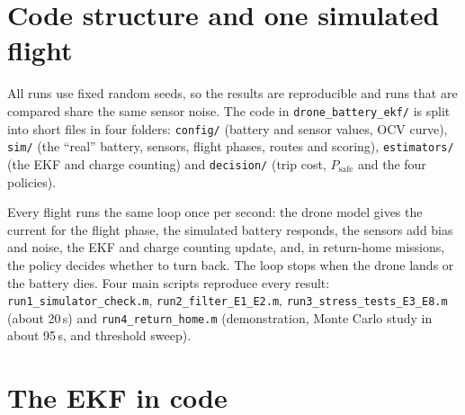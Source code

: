 
\section{Code structure and one simulated flight}\label{sec:i_structure}\label{sec:i_run_flight}\label{sec:i_loop}\label{sec:i_day4}

All runs use fixed random seeds, so the results are reproducible and runs that are compared share the same sensor noise. The code in \texttt{drone\_battery\_ekf/} is split into short files in four folders: \texttt{config/} (battery and sensor values, OCV curve), \texttt{sim/} (the ``real'' battery, sensors, flight phases, routes and scoring), \texttt{estimators/} (the EKF and charge counting) and \texttt{decision/} (trip cost, $P_{\text{safe}}$ and the four policies).

Every flight runs the same loop once per second: the drone model gives the current for the flight phase, the simulated battery responds, the sensors add bias and noise, the EKF and charge counting update, and, in return-home missions, the policy decides whether to turn back. The loop stops when the drone lands or the battery dies. Four main scripts reproduce every result: \texttt{run1\_simulator\_check.m}, \texttt{run2\_filter\_E1\_E2.m}, \texttt{run3\_stress\_tests\_E3\_E8.m} (about 20\,s) and \texttt{run4\_return\_home.m} (demonstration, Monte Carlo study in about 95\,s, and threshold sweep).

\section{The EKF in code}\label{sec:i_ekf}

